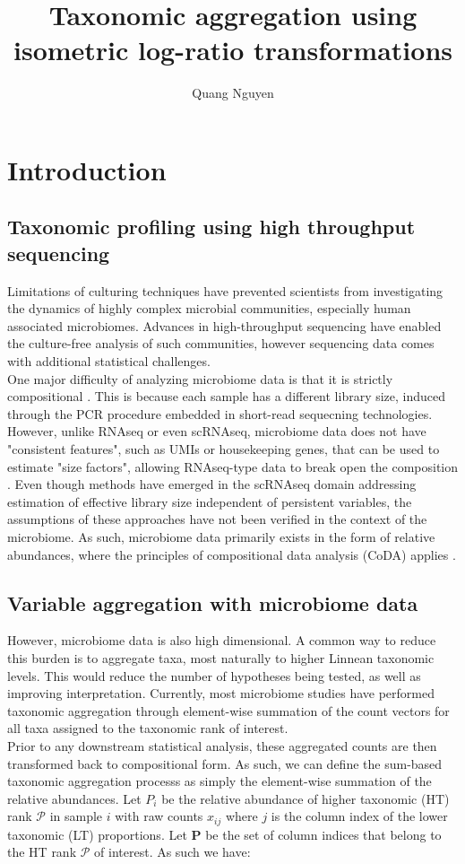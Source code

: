 \documentclass{article}
\title{Taxonomic aggregation using isometric log-ratio transformations}
\author{Quang Nguyen}
\begin{document}
\maketitle

\section{Introduction}
\subsection{Taxonomic profiling using high throughput sequencing}
 Limitations of culturing techniques have prevented scientists from investigating the dynamics of highly complex microbial communities, especially human associated microbiomes. Advances in high-throughput sequencing have enabled the culture-free analysis of such communities, however sequencing data comes with additional statistical challenges. \\
 One major difficulty of analyzing microbiome data is that it is strictly compositional \cite{gloor2017}. This is because each sample has a different library size, induced through the PCR procedure embedded in short-read sequecning technologies. However, unlike RNAseq or even scRNAseq, microbiome data does not have "consistent features", such as UMIs or housekeeping genes, that can be used to estimate "size factors", allowing RNAseq-type data to break open the composition \cite{quinn2018}. Even though methods have emerged in the scRNAseq domain addressing estimation of effective library size independent of persistent variables, the assumptions of these approaches have not been verified in the context of the microbiome. As such, microbiome data primarily exists in the form of relative abundances, where the principles of compositional data analysis (CoDA) applies \cite{aitchison}. 
 \subsection{Variable aggregation with microbiome data} 
 However, microbiome data is also high dimensional. A common way to reduce this burden is to aggregate taxa, most naturally to higher Linnean taxonomic levels. This would reduce the number of hypotheses being tested, as well as improving interpretation. Currently, most microbiome studies have performed taxonomic aggregation through element-wise summation of the count vectors for all taxa assigned to the taxonomic rank of interest. \\ 
 Prior to any downstream statistical analysis, these aggregated counts are then transformed back to compositional form. As such, we can define the sum-based taxonomic aggregation processs as simply the element-wise summation of the relative abundances. Let $P_{i}$ be the relative abundance of higher taxonomic (HT) rank $\mathcal{P}$ in sample $i$ with raw counts $x_{ij}$ where $j$ is the column index of the lower taxonomic (LT) proportions. Let $\bm{P}$ be the set of column indices that belong to the HT rank $\mathcal{P}$ of interest. As such we have:    
\end{document}
